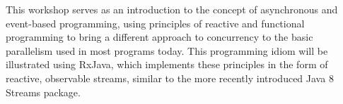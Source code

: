 \documentclass{article}
\begin{document}
  This workshop serves as an introduction to the concept of asynchronous and event-based programming, using principles of reactive and functional programming to bring a different approach to concurrency to the basic parallelism used in most programs today. This programming idiom will be illustrated using RxJava, which implements these principles in the form of reactive, observable streams, similar to the more recently introduced Java 8 Streams package.
\end{document}
